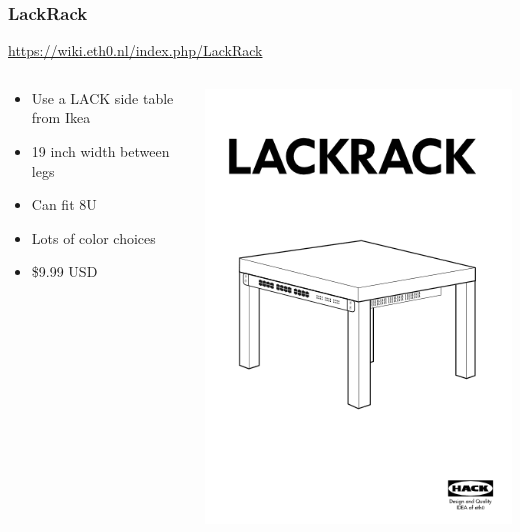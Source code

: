 \documentclass[aspectratio=169,11pt,hyperref={colorlinks=true}]{beamer}
\begin{document}
\begin{frame}
    \frametitle{LackRack}
    \href{https://wiki.eth0.nl/index.php/LackRack}{https://wiki.eth0.nl/index.php/LackRack}
    \begin{columns}[T]
        \begin{column}{.48\textwidth}
            \begin{itemize}
                \item Use a LACK side table from Ikea
                \item 19 inch width between legs
                \item Can fit 8U
                \item Lots of color choices
                \item \$9.99 USD
            \end{itemize}
        \end{column}
        \begin{column}{.48\textwidth}
            \includegraphics[width=\textwidth]{lackrack_cover.png}
        \end{column}
    \end{columns}
\end{frame}
\end{document}
